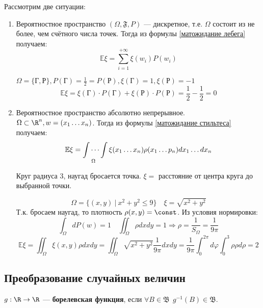 Рассмотрим две ситуации:
\begin{enumerate}
    \item Вероятностное пространство \((\Omega, \mathfrak{F}, P)\) --- дискретное, т.е. \(\Omega\) состоит из не более, чем счётного числа точек. Тогда из формулы \eqref{матожидание лебега} получаем:
          \[\mathbb{E}\xi = \sum_{i = 1}^{+\infty} \xi(w_i) P(w_i)\]

          \begin{example}[``орлянка'']
              \(\Omega = \{\text{Г}, \text{Р}\}, P(\text{Г}) = \frac{1}{2} = P(\text{Р}), \xi(\text{Г}) = 1, \xi(\text{Р}) =- 1\)
              \[\mathbb{E}\xi = \xi(\text{Г}) \cdot P(\text{Г}) + \xi(\text{Р}) \cdot P(\text{Р})= \frac{1}{2} - \frac{1}{2} = 0\]
          \end{example}

    \item Вероятностное пространство абсолютно непрерывное. \(\Omega \subset \R^n, w = (x_1 \dots x_n)\). Тогда из формулы \eqref{матожидание стильтеса} получаем:
          \[\mathbb{E}\xi = \idotsint\limits_\Omega \xi(x_1 \dots x_n) \rho(x_1 \dots p_n) dx_1 \dots dx_n\]

          \begin{example}
              Круг радиуса 3, наугад бросается точка. \(\xi =\) расстояние от центра круга до выбранной точки.

              \[\Omega = \{(x, y)\ |\ x^2 + y^2 \leq 9\} \quad \xi = \sqrt{x^2 + y^2}\]
              Т.к. бросаем наугад, то плотность \(\rho(x, y) = \const\). Из условия нормировки:
              \[\int_\Omega dP(w) = 1 \quad \iint_\Omega \rho dx dy = 1 \Rightarrow \rho = \frac{1}{S_\Omega} = \frac{1}{9\pi}\]
              \[\mathbb{E}\xi = \iint_\Omega \xi(x, y) \rho dx dy = \iint_\Omega \sqrt{x^2 + y^2} \frac{1}{9\pi}dx dy = \frac{1}{9\pi} \int_0^{2\pi} d\varphi \int_0^3 \rho \rho d\rho = 2\]
          \end{example}
\end{enumerate}

\subsection{Преобразование случайных величин}

\begin{definition}
    \(g : \R \to \R\) --- \textbf{борелевская функция}, если \(\forall B \in \mathfrak{B} \ \ g^{ - 1}(B) \in \mathfrak{B}\).
\end{definition}


